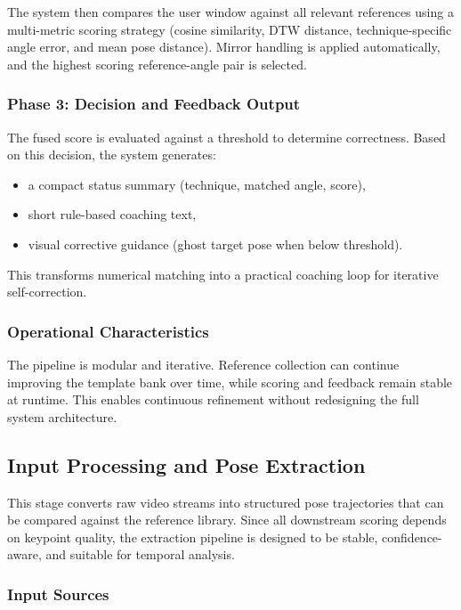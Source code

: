 \documentclass[12pt]{article}
\begin{document}
{The system then compares the user window against all relevant references using a multi-metric scoring strategy (cosine similarity, DTW distance, technique-specific angle error, and mean pose distance). Mirror handling is applied automatically, and the highest scoring reference-angle pair is selected.

\subsubsection{Phase 3: Decision and Feedback Output}

The fused score is evaluated against a threshold to determine correctness. Based on this decision, the system generates:

\begin{itemize}
    \item a compact status summary (technique, matched angle, score),
    \item short rule-based coaching text,
    \item visual corrective guidance (ghost target pose when below threshold).
\end{itemize}

This transforms numerical matching into a practical coaching loop for iterative self-correction.

\subsubsection{Operational Characteristics}

The pipeline is modular and iterative. Reference collection can continue improving the template bank over time, while scoring and feedback remain stable at runtime. This enables continuous refinement without redesigning the full system architecture.

\subsection{Input Processing and Pose Extraction}

This stage converts raw video streams into structured pose trajectories that can be compared against the reference library. Since all downstream scoring depends on keypoint quality, the extraction pipeline is designed to be stable, confidence-aware, and suitable for temporal analysis.

\subsubsection{Input Sources}

}
\end{document}
